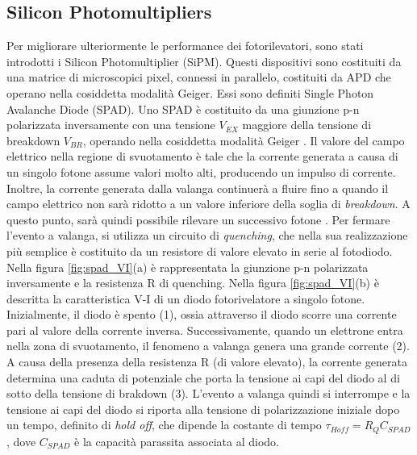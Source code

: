 \subsection{Silicon Photomultipliers}
Per migliorare ulteriormente le performance dei fotorilevatori, sono stati introdotti i Silicon Photomultiplier (SiPM). Questi dispositivi sono costituiti da una matrice di microscopici pixel, connessi in parallelo, costituiti da APD che operano nella cosiddetta modalità Geiger. Essi sono definiti Single Photon Avalanche Diode (SPAD). Uno SPAD è costituito da una giunzione p-n polarizzata inversamente con una tensione $V_{EX}$ maggiore della tensione di breakdown $V_{BR}$, operando nella cosiddetta modalità Geiger \cite{Jiang2019}. Il valore del campo elettrico nella regione di svuotamento è tale che la corrente generata a causa di un singolo fotone assume valori molto alti, producendo un impulso di corrente. Inoltre, la corrente generata dalla valanga continuerà a fluire fino a quando il campo elettrico non sarà ridotto a un valore inferiore della soglia di \textit{breakdown}. A questo punto, sarà quindi possibile rilevare un successivo fotone \cite{Palubiak2011}. Per fermare l'evento a valanga, si utilizza un circuito di \textit{quenching}, che nella sua realizzazione più semplice è costituito da un resistore di valore elevato in serie al fotodiodo. Nella figura \ref{fig:spad_VI}(a) è rappresentata la giunzione p-n polarizzata inversamente e la resistenza R di quenching. Nella figura \ref{fig:spad_VI}(b) è descritta la caratteristica V-I di un diodo fotorivelatore a singolo fotone. Inizialmente, il diodo è spento (1), ossia attraverso il diodo scorre una corrente pari al valore della corrente inversa. Successivamente, quando un elettrone entra nella zona di svuotamento, il fenomeno a valanga genera una grande corrente (2). A causa della presenza della resistenza R (di valore elevato), la corrente generata determina una caduta di potenziale che porta la tensione ai capi del diodo al di sotto della tensione di brakdown (3). L'evento a valanga quindi si interrompe e la tensione ai capi del diodo si riporta alla tensione di polarizzazione iniziale dopo un tempo, definito di \textit{hold off}, che dipende la costante di tempo $\tau_{Hoff}=R_QC_{SPAD}$, dove $C_{SPAD}$ è la capacità parassita associata al diodo.
